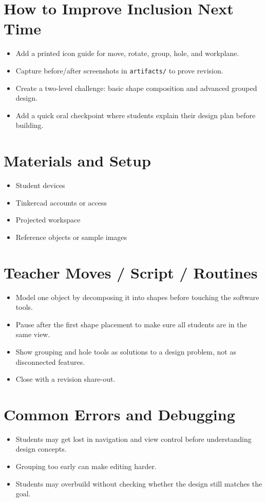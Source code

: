 \documentclass[11pt]{article}
\begin{document}
\section*{How to Improve Inclusion Next Time}
\begin{itemize}[leftmargin=*]
\item Add a printed icon guide for move, rotate, group, hole, and workplane.
\item Capture before/after screenshots in \texttt{artifacts/} to prove revision.
\item Create a two-level challenge: basic shape composition and advanced grouped design.
\item Add a quick oral checkpoint where students explain their design plan before building.
\end{itemize}

\section*{Materials and Setup}
\begin{itemize}[leftmargin=*]
\item Student devices
\item Tinkercad accounts or access
\item Projected workspace
\item Reference objects or sample images
\end{itemize}

\section*{Teacher Moves / Script / Routines}
\begin{itemize}[leftmargin=*]
\item Model one object by decomposing it into shapes before touching the software tools.
\item Pause after the first shape placement to make sure all students are in the same view.
\item Show grouping and hole tools as solutions to a design problem, not as disconnected features.
\item Close with a revision share-out.
\end{itemize}

\section*{Common Errors and Debugging}
\begin{itemize}[leftmargin=*]
\item Students may get lost in navigation and view control before understanding design concepts.
\item Grouping too early can make editing harder.
\item Students may overbuild without checking whether the design still matches the goal.
\end{itemize}
\end{document}
